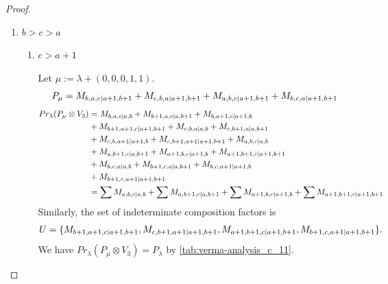 \begin{proof}
\begin{enumerate}
    \item $b>c>a$
      \begin{enumerate}
        \item $c>a+1$ \par
        Let $\mu:=\lambda + (0,0,0,1,1) $.
        \begin{equation}\notag
          \begin{aligned}
            P_\mu = M_{b,a,c|a+1,b+1}
+ M_{c,b,a|a+1,b+1}
+ M_{a,b,c|a+1,b+1}
+ M_{b,c,a|a+1,b+1}
          \end{aligned}
        \end{equation}
        \begin{equation}\notag
          \begin{aligned}
            Pr_{\lambda}(P_\mu \otimes V_{3}) &=
M_{b,a,c|a,b}
+ M_{b+1,a,c|a,b+1}
+ M_{b,a+1,c|a+1,b}\\
                                              &
+ M_{b+1,a+1,c|a+1,b+1}
+ M_{c,b,a|a,b}
+ M_{c,b+1,a|a,b+1}\\
                                              &
+ M_{c,b,a+1|a+1,b}
+ M_{c,b+1,a+1|a+1,b+1}
+ M_{a,b,c|a,b}\\
                                              &
+ M_{a,b+1,c|a,b+1}
+ M_{a+1,b,c|a+1,b}
+ M_{a+1,b+1,c|a+1,b+1}\\
                                              &
+ M_{b,c,a|a,b}
+ M_{b+1,c,a|a,b+1}
+ M_{b,c,a+1|a+1,b}\\
                                              &
+ M_{b+1,c,a+1|a+1,b+1} \\
                                               &=
\sum M_{a,b,c|a,b}
+ \sum M_{a,b+1,c|a,b+1}
+ \sum M_{a+1,b,c|a+1,b}
+ \sum M_{a+1,b+1,c|a+1,b+1}
          \end{aligned}
        \end{equation}
      Similarly, the set of indeterminate composition factors is 
\begin{equation}\notag
  \begin{aligned}
    U = \{
M_{b+1,a+1,c|a+1,b+1},
M_{c,b+1,a+1|a+1,b+1},
M_{a+1,b+1,c|a+1,b+1},
M_{b+1,c,a+1|a+1,b+1}
\}.
  \end{aligned}
\end{equation}
      We have $Pr_{\lambda}(P_\mu \otimes V_{3}) = P_\lambda  $ by \cref{tab:verma-analysis_c_11}.
\begin{table}[htbp]
\centering
\caption{Calculation of Verma modules in $\operatorname{Filt}(P_*) \setminus \operatorname{Filt}(\prl(P_\lambda \otimes V_{3})) $ } \label{tab:verma-analysis_c_11}

\end{table}
\end{enumerate}
\end{enumerate}
\end{proof}
